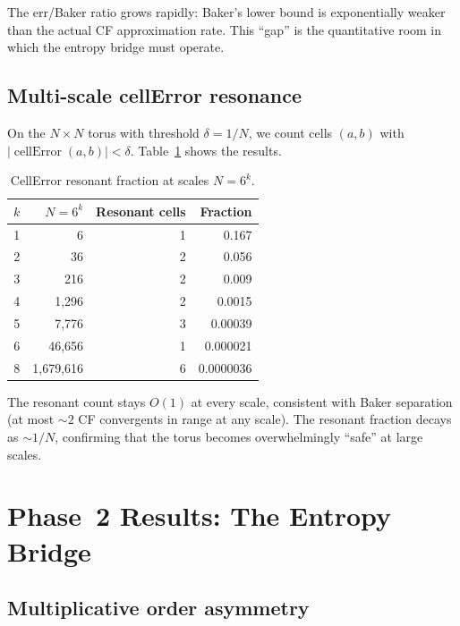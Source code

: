 \documentclass[11pt,a4paper]{article}
\begin{document}
The err/Baker ratio grows rapidly: Baker's lower bound is exponentially
weaker than the actual CF approximation rate.
This ``gap'' is the quantitative room in which the entropy bridge must operate.

\subsection{Multi-scale cellError resonance}

On the $N \times N$ torus with threshold $\delta = 1/N$,
we count cells $(a,b)$ with $|\operatorname{cellError}(a,b)| < \delta$.
Table~\ref{tab:resonant} shows the results.

\begin{table}[h]
\centering
\caption{CellError resonant fraction at scales $N = 6^k$.}
\label{tab:resonant}
\begin{tabular}{rrrr}
\toprule
$k$ & $N = 6^k$ & Resonant cells & Fraction \\
\midrule
1 & 6         & 1 & 0.167 \\
2 & 36        & 2 & 0.056 \\
3 & 216       & 2 & 0.009 \\
4 & 1,296     & 2 & 0.0015 \\
5 & 7,776     & 3 & 0.00039 \\
6 & 46,656    & 1 & 0.000021 \\
8 & 1,679,616 & 6 & 0.0000036 \\
\bottomrule
\end{tabular}
\end{table}

The resonant count stays $O(1)$ at every scale, consistent with
Baker separation (at most $\sim 2$ CF convergents in range at any scale).
The resonant fraction decays as $\sim 1/N$, confirming that the torus
becomes overwhelmingly ``safe'' at large scales.


\section{Phase~2 Results: The Entropy Bridge}

\subsection{Multiplicative order asymmetry}
\end{document}
